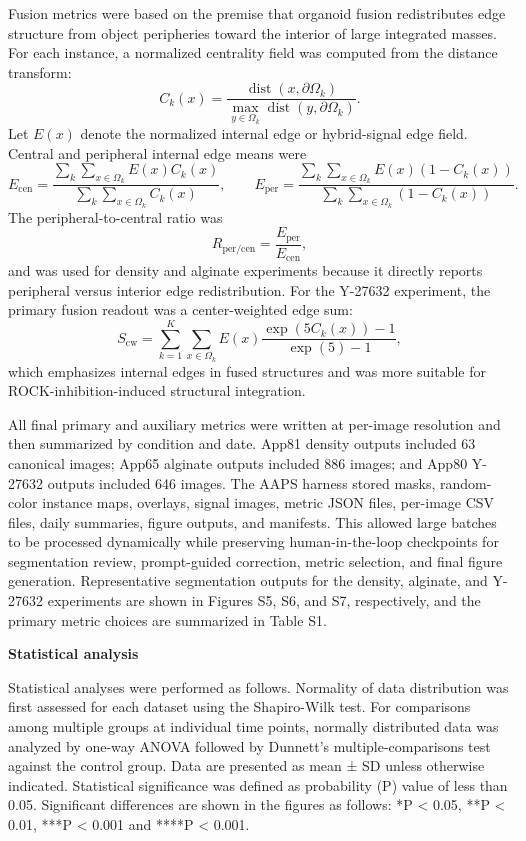 \documentclass[
]{article}
\begin{document}
Fusion metrics were based on the premise that organoid fusion redistributes edge structure from object peripheries toward the interior of large integrated masses. For each instance, a normalized centrality field was computed from the distance transform:
\[
C_k(x)=\frac{\operatorname{dist}(x,\partial\Omega_k)}{\max_{y\in\Omega_k}\operatorname{dist}(y,\partial\Omega_k)}.
\]
Let \(E(x)\) denote the normalized internal edge or hybrid-signal edge field. Central and peripheral internal edge means were
\[
E_{\mathrm{cen}}=\frac{\sum_k\sum_{x\in\Omega_k}E(x)C_k(x)}{\sum_k\sum_{x\in\Omega_k}C_k(x)}, \qquad
E_{\mathrm{per}}=\frac{\sum_k\sum_{x\in\Omega_k}E(x)(1-C_k(x))}{\sum_k\sum_{x\in\Omega_k}(1-C_k(x))}.
\]
The peripheral-to-central ratio was
\[
R_{\mathrm{per/cen}}=\frac{E_{\mathrm{per}}}{E_{\mathrm{cen}}},
\]
and was used for density and alginate experiments because it directly reports peripheral versus interior edge redistribution. For the Y-27632 experiment, the primary fusion readout was a center-weighted edge sum:
\[
S_{\mathrm{cw}}=\sum_{k=1}^{K}\sum_{x\in\Omega_k}E(x)\frac{\exp(5C_k(x))-1}{\exp(5)-1},
\]
which emphasizes internal edges in fused structures and was more suitable for ROCK-inhibition-induced structural integration.

All final primary and auxiliary metrics were written at per-image resolution and then summarized by condition and date. App81 density outputs included 63 canonical images; App65 alginate outputs included 886 images; and App80 Y-27632 outputs included 646 images. The AAPS harness stored masks, random-color instance maps, overlays, signal images, metric JSON files, per-image CSV files, daily summaries, figure outputs, and manifests. This allowed large batches to be processed dynamically while preserving human-in-the-loop checkpoints for segmentation review, prompt-guided correction, metric selection, and final figure generation. Representative segmentation outputs for the density, alginate, and Y-27632 experiments are shown in Figures S5, S6, and S7, respectively, and the primary metric choices are summarized in Table S1.

\textbf{Statistical analysis}

Statistical analyses were performed as follows. Normality of data distribution was first assessed for each dataset using the Shapiro-Wilk test. For comparisons among multiple groups at individual time points, normally distributed data was analyzed by one-way ANOVA followed by Dunnett's multiple-comparisons test against the control group. Data are presented as mean ± SD unless otherwise indicated. Statistical significance was defined as probability (P) value of less than 0.05. Significant differences are shown in the figures as follows: *P \textless{} 0.05, **P \textless{} 0.01, ***P \textless{} 0.001 and ****P \textless{} 0.001.
\end{document}
